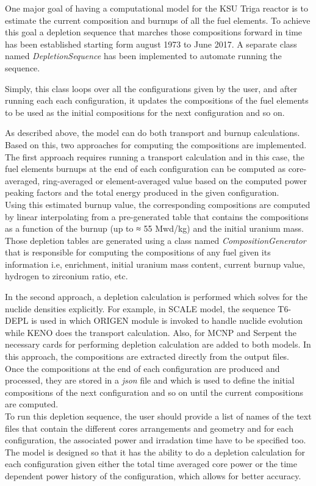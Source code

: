 \documentclass[review,number,sort&compress,12pt]{elsarticle}
\begin{document}
One major goal of having a computational model for the KSU Triga reactor is to estimate the current composition and burnups of all the fuel elements. To achieve this goal a depletion sequence that marches those compositions forward in time has been established starting form august 1973 to June 2017.
A separate class named \emph{DepletionSequence} has been implemented to automate running the sequence. 

Simply, this class loops over all the configurations given by the user, and after running each each configuration, it updates the compositions of the fuel elements to be used as the initial compositions for the next configuration and so on.

As described above, the model can do both transport and burnup calculations. Based on this, two approaches for computing the compositions are implemented.\\
The first approach requires running a transport calculation and in this case, the fuel elements burnups at the end of each configuration can be computed as core-averaged, ring-averaged or element-averaged value based on the computed power peaking factors and the total energy produced in the given configuration. \\
Using this estimated burnup value, the corresponding compositions are
computed by linear interpolating from a pre-generated table that contains the compositions as
a function of the burnup (up to ≈ 55 Mwd/kg) and the initial uranium mass.
Those depletion tables are generated using a class named \emph{CompositionGenerator} that is responsible for computing the compositions of any fuel given its information i.e, enrichment, initial uranium mass content, current burnup value, hydrogen to zirconium ratio, etc.

In the second approach, a depletion calculation is performed which solves for the nuclide densities explicitly. For example, in SCALE model, the sequence T6-DEPL is used in which ORIGEN module is invoked to handle nuclide evolution while KENO does the transport calculation.
Also, for MCNP and Serpent the necessary cards for performing depletion calculation are added to both models. In this approach, the compositions are extracted directly from the output files. \\
Once the compositions at the end of each configuration are produced and processed, they are stored in a \emph{json} file and which is used to define the initial compositions of the next configuration and so on until the current compositions are computed.\\
To run this depletion sequence, the user should provide a list of names of the text files that contain the different cores arrangements and geometry and for each configuration, the associated power and irradation time have to be specified too. The model is designed so that it has the ability to do a depletion calculation for each configuration given either the total time averaged core power or the time dependent power history of the configuration, which allows for better accuracy.
\end{document}
